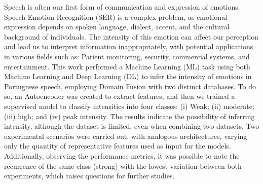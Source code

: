 Speech is often our first form of communication and expression of emotions. Speech Emotion Recognition (SER) is a complex problem, as emotional expression depends on spoken language, dialect, accent, and the cultural background of individuals. The intensity of this emotion can affect our perception and lead us to interpret information inappropriately, with potential applications in various fields such as: Patient monitoring, security, commercial systems, and entertainment. This work performed a Machine Learning (ML) task using both Machine Learning and Deep Learning (DL) to infer the intensity of emotions in Portuguese speech, employing Domain Fusion with two distinct databases. To do so, an Autoencoder was created to extract features, and then we trained a supervised model to classify intensities into four classes: (i) Weak; (ii) moderate; (iii) high; and (iv) peak intensity. The results indicate the possibility of inferring intensity, although the dataset is limited, even when combining two datasets. Two experimental scenarios were carried out, with analogous architectures, varying only the quantity of representative features used as input for the models. Additionally, observing the performance metrics, it was possible to note the recurrence of the same class (strong) with the lowest variation between both experiments, which raises questions for further studies.